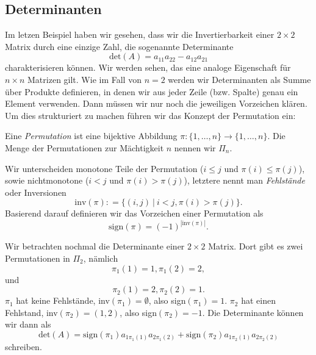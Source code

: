 \subsection{Determinanten}
\label{\detokenize{vektorraeume/LGS:determinanten}}
Im letzen Beispiel haben wir gesehen, dass wir die Invertierbarkeit einer \(2 \times 2\) Matrix durch eine einzige Zahl, die sogenannte Determinante
\begin{equation*}
 \text{det}(A) = a_{11} a_{22} - a_{12} a_{21}
\end{equation*}
charakterisieren können. Wir werden sehen, das eine analoge Eigenschaft für \(n \times n\) Matrizen gilt. Wie im Fall von \(n=2\) werden wir Determinanten als Summe über Produkte definieren, in denen wir aus jeder Zeile (bzw. Spalte) genau ein Element verwenden. Dann müssen wir nur noch die jeweiligen Vorzeichen klären. Um dies strukturiert zu machen führen wir das Konzept der Permutation ein:
\label{vektorraeume/LGS:definition-10}
\begin{definition}{}{}



Eine \emph{Permutation} ist eine bijektive Abbildung \(\pi: \{1,\ldots,n\} \rightarrow \{1,\ldots,n\} \). Die Menge der Permutationen zur Mächtigkeit \(n\) nennen wir \(\Pi_n\).
\end{definition}

Wir unterscheiden monotone Teile der Permutation (\(i \leq j\) und \(\pi(i) \leq \pi(j)\)), sowie nichtmonotone (\(i < j\) und \(\pi(i) > \pi(j)\)), letztere nennt man \emph{Fehlstände} oder Inversionen
\begin{equation*}
 \text{inv}(\pi): = \{(i,j)~|~i<j, \pi(i) > \pi(j) \}.
\end{equation*}
Basierend darauf definieren wir das Vorzeichen einer Permutation als
\begin{equation*}
 \text{sign}(\pi) =(-1)^{|\text{inv}(\pi)|}.
\end{equation*}\label{vektorraeume/LGS:example-11}
\begin{example}{}{}



Wir betrachten nochmal die Determinante einer \(2 \times 2\) Matrix. Dort gibt es zwei Permutationen in \(\Pi_2\), nämlich
\begin{equation*}
 \pi_1(1)=1, \pi_1(2)=2,
\end{equation*}
und
\begin{equation*}
 \pi_2(1)=2, \pi_2(2)=1.
\end{equation*}
\(\pi_1\) hat keine Fehlstände, inv\((\pi_1)=\emptyset\), also sign\((\pi_1)=1\). \(\pi_2\) hat einen Fehlstand, inv\((\pi_2)={(1,2)}\),
also  sign\((\pi_2)=-1\). Die Determinante können wir dann als
\begin{equation*}
 \text{det}(A) =  \text{sign}(\pi_1) a_{1\pi_1(1)} a_{2\pi_1(2)} + \text{sign}(\pi_2) a_{1\pi_2(1)} a_{2\pi_2(2)}\end{equation*}
schreiben.
\end{example}

